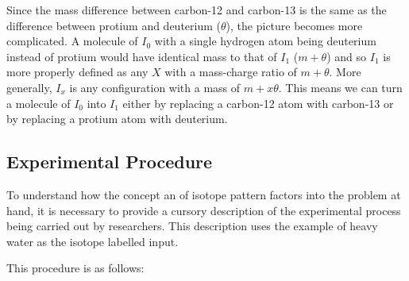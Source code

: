 \documentclass{l4proj}
\begin{document}
Since the mass difference between carbon-12 and carbon-13 is the same as the difference between protium and deuterium ($\theta$), the picture becomes more complicated. A molecule of $I_0$ with a single hydrogen atom being deuterium instead of protium would have identical mass to that of $I_1$ ($m+\theta$) and so $I_1$ is more properly defined as any $X$ with a mass-charge ratio of $m+\theta$. More generally, $I_x$ is any configuration with a mass of $m + x\theta$. This means we can turn a molecule of $I_0$ into $I_1$ either by replacing a carbon-12 atom with carbon-13 or by replacing a protium atom with deuterium.

\subsection{Experimental Procedure} \label{experimental-procedure}
To understand how the concept an of isotope pattern factors into the problem at hand, it is necessary to provide a cursory description of the experimental process being carried out by researchers. This description uses the example of heavy water as the isotope labelled input. 

This procedure is as follows:
\end{document}
